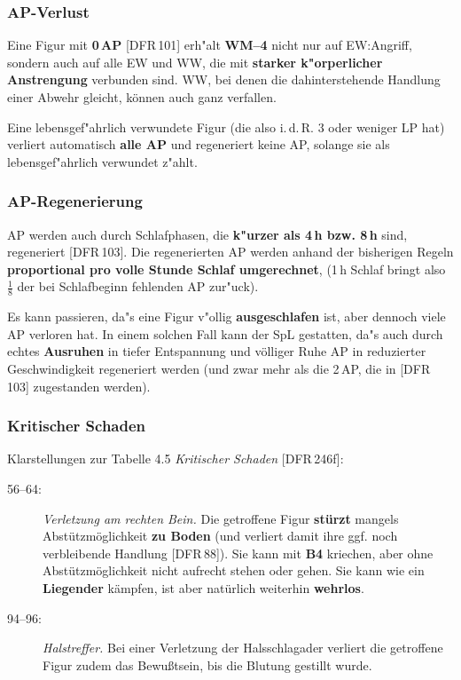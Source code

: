 \documentclass[10pt,a4paper,germanpar]{article}
\begin{document}
\subsubsection{AP-Verlust}

Eine Figur mit \textbf{0\,AP} [DFR\,101] erh"alt \textbf{WM--4} nicht
nur auf EW:Angriff, sondern auch auf alle EW und WW, die mit
\textbf{starker k"orperlicher Anstrengung} verbunden sind. WW, bei
denen die dahinterstehende Handlung einer Abwehr gleicht, können
auch ganz verfallen.

Eine lebensgef"ahrlich verwundete Figur (die also i.\,d.\,R. 3 oder
weniger LP hat) verliert automatisch \textbf{alle AP} und regeneriert
keine AP, solange sie als lebensgef"ahrlich verwundet z"ahlt.

\subsubsection{AP-Regenerierung}

AP werden auch durch Schlafphasen, die \textbf{k"urzer als 4\,h bzw.
  8\,h} sind, regeneriert [DFR\,103]. Die regenerierten AP werden
anhand der bisherigen Regeln \textbf{proportional pro volle Stunde
  Schlaf umgerechnet}, (1\,h Schlaf bringt also $\frac{1}{8}$
der bei Schlafbeginn fehlenden AP zur"uck).

Es kann passieren, da"s eine Figur v"ollig \textbf{ausgeschlafen} ist,
aber dennoch viele AP verloren hat. In einem solchen Fall kann der SpL
gestatten, da"s auch durch echtes \textbf{Ausruhen} in tiefer
Entspannung und völliger Ruhe AP in reduzierter Geschwindigkeit
regeneriert werden (und zwar mehr als die 2\,AP, die in [DFR\,103]
zugestanden werden).

\subsubsection{Kritischer Schaden}

Klarstellungen zur Tabelle 4.5 \emph{Kritischer Schaden} [DFR\,246f]:

\begin{description}
\item[56--64:] \emph{Verletzung am rechten Bein.} Die getroffene Figur
  \textbf{stürzt} mangels Ab\-stütz\-mög\-lich\-keit \textbf{zu Boden}
  (und verliert damit ihre ggf. noch verbleibende Handlung [DFR\,88]).
  Sie kann mit \textbf{B4} kriechen, aber ohne
  Ab\-stütz\-mög\-lich\-keit nicht aufrecht stehen oder gehen. Sie
  kann wie ein \textbf{Liegender} kämpfen, ist aber natürlich
  weiterhin \textbf{wehrlos}.
\item[94--96:] \emph{Halstreffer.} Bei einer Verletzung der
  Halsschlagader verliert die getroffene Figur zudem das Bewußtsein,
  bis die Blutung gestillt wurde.
\end{description}
\end{document}
